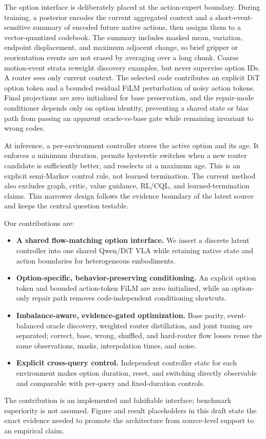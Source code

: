 The option interface is deliberately placed at the action-expert boundary.
During training, a posterior encodes the current aggregated context and a
short-event-sensitive summary of encoded future native actions, then assigns
them to a vector-quantized codebook.  The summary includes masked mean,
variation, endpoint displacement, and maximum adjacent change, so brief gripper
or reorientation events are not erased by averaging over a long chunk.  Coarse
motion-event strata reweight discovery examples, but never supervise option
IDs.  A router sees only current context.  The selected code contributes an
explicit DiT option token and a bounded residual FiLM perturbation of noisy
action tokens.  Final projections are zero initialized for base preservation,
and the repair-mode conditioner depends only on option identity, preventing a
shared state or bias path from passing an apparent oracle-vs-base gate while
remaining invariant to wrong codes.

At inference, a per-environment controller stores the active option and its age.
It enforces a minimum duration, permits hysteretic switches when a new router
candidate is sufficiently better, and reselects at a maximum age.  This is an
explicit semi-Markov control rule, not learned termination.  The current method
also excludes graph, critic, value guidance, RL/CQL, and learned-termination
claims.  This narrower design follows the evidence boundary of the latest
source and keeps the central question testable.

Our contributions are:
\begin{itemize}
    \item \textbf{A shared flow-matching option interface.} We insert a
    discrete latent controller into one shared Qwen/DiT VLA while retaining
    native state and action boundaries for heterogeneous embodiments.
    \item \textbf{Option-specific, behavior-preserving conditioning.} An
    explicit option token and bounded action-token FiLM are zero initialized,
    while an option-only repair path removes code-independent conditioning
    shortcuts.
    \item \textbf{Imbalance-aware, evidence-gated optimization.} Base parity,
    event-balanced oracle discovery, weighted router distillation, and joint
    tuning are separated; correct, base, wrong, shuffled, and hard-router flow
    losses reuse the same observations, masks, interpolation times, and noise.
    \item \textbf{Explicit cross-query control.} Independent controller state
    for each environment makes option duration, reset, and switching directly
    observable and comparable with per-query and fixed-duration controls.
\end{itemize}

The contribution is an implemented and falsifiable interface; benchmark
superiority is not assumed.  Figure and result placeholders in this draft
state the exact evidence needed to promote the architecture from source-level
support to an empirical claim.
